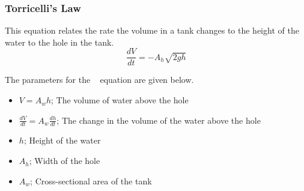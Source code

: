                             \subsubsection{Torricelli's Law} \label{subsubsec:Torricelli's Law}
                            \begin{definition} \label{def:Torricelli's Law}
                              This equation relates the rate the volume in a tank changes to the height of the water to the hole in the tank.
                              \begin{equation} \label{eq:Torricelli's Law}
                                \frac{dV}{dt} = -A_{h} \sqrt{2gh}
                              \end{equation}
                              \begin{remark}
                                The parameters for the ~ equation are given below.
                                \begin{itemize}[noitemsep, nolistsep]
                                \item $V = A_{w}h$; The volume of water above the hole
                                \item $\frac{dV}{dt} = A_{w} \frac{dh}{dt}$; The change in the volume of the water above the hole
                                \item $h$; Height of the water
                                \item $A_{h}$; Width of the hole
                                \item $A_{w}$; Cross-sectional area of the tank
                              \end{itemize}
                            \end{remark}
                          \end{definition}
                              
